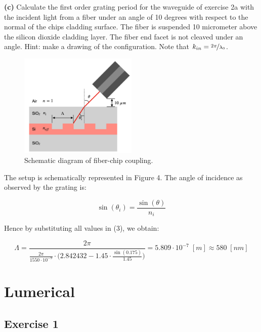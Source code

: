 \documentclass[11pt,a4paper]{article}
\begin{document}
\begin{displayquote}
    \textbf{(c)} Calculate the first order grating period for the waveguide of exercise 2a with the incident light from a fiber under an angle of 10 degrees with respect to the normal of the chips cladding surface. The fiber is suspended 10 micrometer above the silicon dioxide cladding layer. The fiber end facet is not cleaved under
an angle. Hint: make a drawing of the configuration. Note that $k_{in}=\nicefrac{2\pi}{\lambda_0}$.
\end{displayquote}

\begin{figure}[ht]
    \centering
    \includegraphics[width=0.5\textwidth]{fig_4.png}
    \caption{Schematic diagram of fiber-chip coupling.}
\end{figure}

The setup is schematically represented in Figure 4. The angle of incidence as observed by the grating is:

\begin{equation*}
    \sin{(\theta_i)}=\frac{\sin{(\theta)}}{n_{i}}
\end{equation*}

Hence by substituting all values in (3), we obtain:

\begin{equation*}
    \Lambda = \frac{2\pi}{\frac{2\pi}{1550\cdot{10^{-9}}}\cdot\Big(2.842432-1.45\cdot\frac{\sin{(0.175)}}{1.45}\Big)}=5.809\cdot10^{-7} \; [m]\approx580 \; [nm]
\end{equation*}

\newpage


\section{Lumerical}

\subsection*{Exercise 1}
\end{document}
